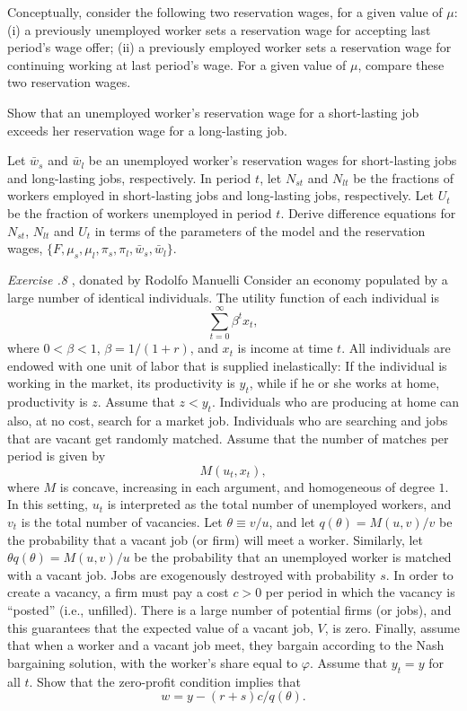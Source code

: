 \medskip
{} Conceptually, consider the following two reservation wages,
for a given value of $\mu$: (i) a previously unemployed worker sets a
reservation wage for accepting last period's wage offer;
(ii) a previously employed worker sets a reservation wage for continuing
working at last period's wage. For a given value of $\mu$, compare these
two reservation wages.

\medskip
{} Show that an unemployed worker's reservation wage for
a short-lasting job exceeds her reservation wage for a long-lasting job.

\medskip
{} Let $\bar w_s$ and $\bar w_l$ be
an unemployed worker's reservation wages for
short-lasting jobs and long-lasting jobs, respectively. In period $t$,
let $N_{st}$ and $N_{lt}$ be the fractions of workers employed
in short-lasting jobs and long-lasting jobs, respectively. Let $U_t$
 be the fraction of workers unemployed in period $t$. Derive difference
equations for $N_{st}$, $N_{lt}$ and $U_t$ in terms of the parameters
of the model and the reservation wages,
$\{F,\mu_s,\mu_l,\pi_s,\pi_l,\bar w_s,\bar w_l\}$.

\medskip

\noindent
{\it Exercise \the\chapternum.8} , donated by Rodolfo Manuelli
\medskip \noindent
Consider an economy populated by a large number of identical individuals.
  The utility function of each individual is
$$ \sum_{t=0}^\infty \beta ^t  x_t, $$
where $0 < \beta < 1$, $\beta=1/(1+r)$, and $x_t$ is income
at time $t$.  All individuals are endowed with one unit of labor
that is supplied inelastically: If the individual is working in the market,
its productivity is $y_t$, while if he or she works at home,
productivity is $z$.  Assume that $z < y_t$.  Individuals who
are producing at home can also, at no cost, search for a
market job.  Individuals who are searching and jobs that are vacant get
randomly matched.
    Assume that the number of matches per period is given by
$$ M(u_t, x_t), $$
where $M$ is concave, increasing in each
argument, and homogeneous of degree $1$. In this
setting, $u_t$ is interpreted as the total number of unemployed
workers, and $v_t$ is the total number of vacancies.
Let $\theta \equiv v/u$, and let $q(\theta) = M(u,v)/v$ be
 the probability that a vacant job (or firm) will meet a worker.
  Similarly, let $\theta q(\theta) = M(u,v)/u$ be the probability that
an unemployed worker is matched with a vacant job.  Jobs are exogenously
destroyed with probability $s$.
    In order to create a vacancy, a firm must pay a cost $c > 0$ per
period in which the vacancy is ``posted'' (i.e., unfilled).  There is a large
number of potential firms (or jobs), and this guarantees that the expected
value of a vacant job, $V$, is zero.
    Finally, assume that when a worker and a vacant job meet, they
bargain according to the Nash bargaining solution, with the worker's share
equal to $\varphi$.  Assume that $y_t = y$ for all $t$.
\medskip
  Show that the zero-profit condition implies that
$$ w = y - (r+s)c/q(\theta). $$

